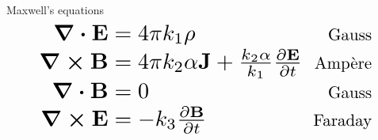 \documentclass[aspectratio=169]{beamer}
\begin{document}
\begin{frame}{Maxwell's equations}
  \begin{align*}
    \scalebox{2}{$\div \vb{E}$} & \scalebox{2}{$\; = 4 \pi k_1 \rho$} &  \scalebox{1.5}{\text{Gauss}}\\
    \scalebox{2}{$\curl \vb{B}$} & \scalebox{2}{$\; = 4 \pi k_2 \alpha \vb{J} + \frac{k_2 \alpha}{k_1} \pdv{\vb{E}}{t}$} & \scalebox{1.5}{\text{Amp\`ere}} \\
    \scalebox{2}{$\div \vb{B}$} & \scalebox{2}{$\; = 0$} & \scalebox{1.5}{\text{Gauss}} \\
    \scalebox{2}{$\curl \vb{E}$} & \scalebox{2}{$\; = -k_3 \pdv{\vb{B}}{t}$} & \scalebox{1.5}{\text{Faraday}} \\
  \end{align*}
\end{frame}
\end{document}
